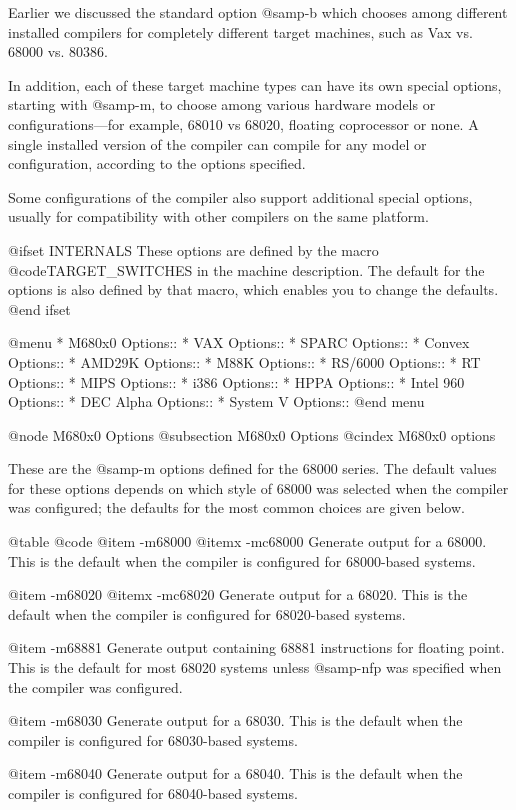 {{Earlier we discussed the standard option @samp{-b} which chooses among
different installed compilers for completely different target
machines, such as Vax vs. 68000 vs. 80386.

In addition, each of these target machine types can have its own
special options, starting with @samp{-m}, to choose among various
hardware models or configurations---for example, 68010 vs 68020,
floating coprocessor or none.  A single installed version of the
compiler can compile for any model or configuration, according to the
options specified.

Some configurations of the compiler also support additional special
options, usually for compatibility with other compilers on the same
platform.

@ifset INTERNALS
These options are defined by the macro @code{TARGET_SWITCHES} in the
machine description.  The default for the options is also defined by
that macro, which enables you to change the defaults.
@end ifset

@menu
* M680x0 Options::
* VAX Options::
* SPARC Options::
* Convex Options::
* AMD29K Options::
* M88K Options::
* RS/6000 Options::
* RT Options::
* MIPS Options::
* i386 Options::
* HPPA Options::
* Intel 960 Options::
* DEC Alpha Options::
* System V Options::
@end menu

@node M680x0 Options
@subsection M680x0 Options
@cindex M680x0 options

These are the @samp{-m} options defined for the 68000 series.  The default
values for these options depends on which style of 68000 was selected when
the compiler was configured; the defaults for the most common choices are
given below.

@table @code
@item -m68000
@itemx -mc68000
Generate output for a 68000.  This is the default
when the compiler is configured for 68000-based systems.

@item -m68020
@itemx -mc68020
Generate output for a 68020.  This is the default
when the compiler is configured for 68020-based systems.

@item -m68881
Generate output containing 68881 instructions for floating point.
This is the default for most 68020 systems unless @samp{-nfp} was
specified when the compiler was configured.

@item -m68030
Generate output for a 68030.  This is the default
when the compiler is configured for 68030-based systems.

@item -m68040
Generate output for a 68040.  This is the default
when the compiler is configured for 68040-based systems.

}}
